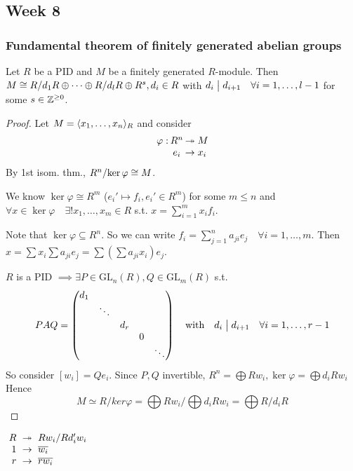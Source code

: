 \subsection{Week 8}
\subsubsection{Fundamental theorem of finitely generated abelian groups}

\begin{theorem}
  Let $R$ be a PID and $M$ be a finitely generated $R$-module.
  Then $M \cong {R}/{d_1 R} \oplus \dots \oplus {R}/{d_l R} \oplus R^s,
  d_i \in R$ with $d_i \mathrel{\big|} d_{i+1} \quad \forall i = 1, \dots, l-1$
  for some $s \in \mathbb{Z}^{\ge 0}$.

  \begin{proof}
    Let $M = \langle x_1, \dots, x_n\rangle_R$ and consider
    \[
      \arraycolsep=1pt
      \begin{array}{rcl}
        \varphi: & R^n & \onto M \\
                 & e_i & \to x_i
      \end{array}
    \]
    By 1st isom. thm., ${R^n}/{\ker \varphi} \cong M$.

    We know $\ker \varphi \cong R^m$ ($e_i' \mapsto f_i, e_i' \in R^m$)
    for some $m \le n$ and
    $\forall x \in \ker\varphi \quad \exists! x_1, \dots, x_m \in R$ s.t.
    $x = \sum_{i=1}^m x_i f_i$.

    Note that $\ker \varphi \subseteq R^n$. So we can write
    $f_i = \sum_{j=1}^n a_{ji}e_j \quad \forall i = 1,\dots, m$.
    Then $x = \sum x_i \sum a_{ji}e_j =
    \sum \left(\sum a_{ji}x_i\right) e_j$.

    $R$ is a PID $\implies \exists P \in \text{GL}_n(R), Q \in \text{GL}_m(R)$
    s.t.
    \[
      PAQ = \begin{pmatrix}
      d_1 \\
      & \ddots \\
      & & d_r \\
      & & & 0 \\
      & & & & \ddots
      \end{pmatrix}
      \quad \text{with} \quad
      d_i \mathrel{\big|} d_{i+1} \quad \forall i = 1, \dots, r-1
    \]
    So consider $[w_i] = Q e_i$. Since $P, Q$ invertible, $R^n = \bigoplus R w_i, \ker \varphi = \bigoplus d_i R w_i$
    Hence
    \[ M \simeq R / ker \varphi = \bigoplus R w_i / \bigoplus d_i R w_i = \bigoplus R / d_i R \]
  \end{proof}

  $\arraycolsep=3pt
  \begin{array}{rcl}
    R & \onto & \quot{Rw_i}{Rd_i'w_i} \\
    1 & \to & \ob{w_i} \\
    r & \to & \ob{rw_i}
  \end{array}
  $
\end{theorem}


